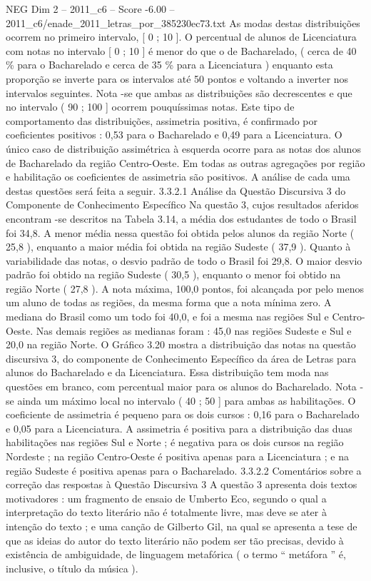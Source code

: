 \begin{textsample}{NEG Dim 2 – 2011\_c6 – Score -6.00 – 2011\_c6/enade\_2011\_letras\_por\_385230ec73.txt}
As modas destas distribuições ocorrem no primeiro intervalo, [ 0 ; 10 ].
O percentual de alunos de Licenciatura com notas no intervalo [ 0 ; 10 ] é menor do que o de Bacharelado, ( cerca de 40 \% para o Bacharelado e cerca de 35 \% para a Licenciatura ) enquanto esta proporção se inverte para os intervalos até 50 pontos e voltando a inverter nos intervalos seguintes.
Nota -se que ambas as distribuições são decrescentes e que no intervalo ( 90 ; 100 ] ocorrem pouquíssimas notas.
Este tipo de comportamento das distribuições, assimetria positiva, é confirmado por coeficientes positivos : 0,53 para o Bacharelado e 0,49 para a Licenciatura.
O único caso de distribuição assimétrica à esquerda ocorre para as notas dos alunos de Bacharelado da região Centro-Oeste.
Em todas as outras agregações por região e habilitação os coeficientes de assimetria são positivos.
A análise de cada uma destas questões será feita a seguir. 3.3.2.1 Análise da Questão Discursiva 3 do Componente de Conhecimento Específico Na questão 3, cujos resultados aferidos encontram -se descritos na Tabela 3.14, a média dos estudantes de todo o Brasil foi 34,8.
A menor média nessa questão foi obtida pelos alunos da região Norte ( 25,8 ), enquanto a maior média foi obtida na região Sudeste ( 37,9 ).
Quanto à variabilidade das notas, o desvio padrão de todo o Brasil foi 29,8.
O maior desvio padrão foi obtido na região Sudeste ( 30,5 ), enquanto o menor foi obtido na região Norte ( 27,8 ).
A nota máxima, 100,0 pontos, foi alcançada por pelo menos um aluno de todas as regiões, da mesma forma que a nota mínima zero.
A mediana do Brasil como um todo foi 40,0, e foi a mesma nas regiões Sul e Centro-Oeste.
Nas demais regiões as medianas foram : 45,0 nas regiões Sudeste e Sul e 20,0 na região Norte.
O Gráfico 3.20 mostra a distribuição das notas na questão discursiva 3, do componente de Conhecimento Específico da área de Letras para alunos do Bacharelado e da Licenciatura.
Essa distribuição tem moda nas questões em branco, com percentual maior para os alunos do Bacharelado.
Nota -se ainda um máximo local no intervalo ( 40 ; 50 ] para ambas as habilitações.
O coeficiente de assimetria é pequeno para os dois cursos : 0,16 para o Bacharelado e 0,05 para a Licenciatura.
A assimetria é positiva para a distribuição das duas habilitações nas regiões Sul e Norte ; é negativa para os dois cursos na região Nordeste ; na região Centro-Oeste é positiva apenas para a Licenciatura ; e na região Sudeste é positiva apenas para o Bacharelado. 3.3.2.2 Comentários sobre a correção das respostas à Questão Discursiva 3 A questão 3 apresenta dois textos motivadores : um fragmento de ensaio de Umberto Eco, segundo o qual a interpretação do texto literário não é totalmente livre, mas deve se ater à intenção do texto ; e uma canção de Gilberto Gil, na qual se apresenta a tese de que as ideias do autor do texto literário não podem ser tão precisas, devido à existência de ambiguidade, de linguagem metafórica ( o termo “ metáfora ” é, inclusive, o título da música ).

\end{textsample}
